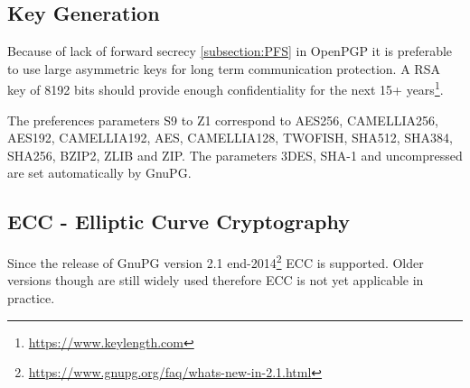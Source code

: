 \subsection{Key Generation}
\gdef\currentsectionname{GPG}
\gdef\currentsubsectionname{GnuPG}
Because of lack of forward secrecy \ref{subsection:PFS} in OpenPGP it is preferable to use large asymmetric keys for long term
communication protection. A RSA key of 8192 bits should provide enough confidentiality for the next 15+ years\footnote{\url{https://www.keylength.com}}.



The preferences parameters S9 to Z1 correspond to AES256, CAMELLIA256, AES192, CAMELLIA192, AES, CAMELLIA128, TWOFISH,
SHA512, SHA384, SHA256, BZIP2, ZLIB and ZIP. The parameters 3DES, SHA-1 and uncompressed are set automatically by GnuPG.

\subsection{ECC - Elliptic Curve Cryptography}
Since the release of GnuPG version 2.1 end-2014\footnote{\url{https://www.gnupg.org/faq/whats-new-in-2.1.html}} ECC is supported. Older versions though are still widely used therefore ECC is not yet applicable in practice. 












